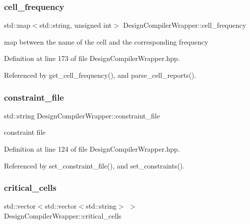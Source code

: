 \subsubsection{\texorpdfstring{cell\+\_\+frequency}{cell\_frequency}}
{\footnotesize\ttfamily std\+::map$<$std\+::string, unsigned int$>$ Design\+Compiler\+Wrapper\+::cell\+\_\+frequency\hspace{0.3cm}{\ttfamily [protected]}}



map between the name of the cell and the corresponding frequency 



Definition at line 173 of file Design\+Compiler\+Wrapper.\+hpp.



Referenced by get\+\_\+cell\+\_\+frequency(), and parse\+\_\+cell\+\_\+reports().

\mbox{\label{classDesignCompilerWrapper_a659e9d5700f46b5ea0980ee6a8545b69}} 
\subsubsection{\texorpdfstring{constraint\+\_\+file}{constraint\_file}}
{\footnotesize\ttfamily std\+::string Design\+Compiler\+Wrapper\+::constraint\+\_\+file\hspace{0.3cm}{\ttfamily [protected]}}



constraint file 



Definition at line 124 of file Design\+Compiler\+Wrapper.\+hpp.



Referenced by set\+\_\+constraint\+\_\+file(), and set\+\_\+constraints().

\mbox{\label{classDesignCompilerWrapper_a3d84353310f895bec66d2253be0e26ea}} 
\subsubsection{\texorpdfstring{critical\+\_\+cells}{critical\_cells}}
{\footnotesize\ttfamily std\+::vector$<$std\+::vector$<$std\+::string$>$ $>$ Design\+Compiler\+Wrapper\+::critical\+\_\+cells\hspace{0.3cm}{\ttfamily [protected]}}




